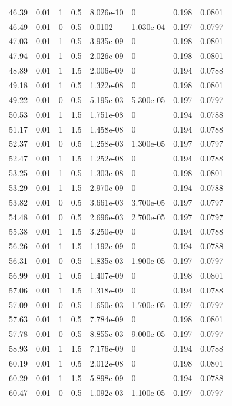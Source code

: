 \documentclass[preview]{standalone}
\begin{document}
{{{\begin{tabular}{L{1.2cm}C{1.2cm} C{0.3cm}C{0.5cm} C{1.4cm}C{1.4cm} C{1.4cm}C{1.4cm}}
  46.39  &  0.01  & 1     & 0.5 &  8.026e-10  & 0  & 0.198 &  0.0801   \\ 
  46.49  &  0.01  & 0     & 0.5 &  0.0102  & 1.030e-04  & 0.197 &  0.0797   \\ 
  47.03  &  0.01  & 1     & 0.5 &  3.935e-09  & 0  & 0.198 &  0.0801   \\ 
  47.94  &  0.01  & 1     & 0.5 &  2.026e-09  & 0  & 0.198 &  0.0801   \\ 
  48.89  &  0.01  & 1     & 1.5 &  2.006e-09  & 0  & 0.194 &  0.0788   \\ 
  49.18  &  0.01  & 1     & 0.5 &  1.322e-08  & 0  & 0.198 &  0.0801   \\ 
  49.22  &  0.01  & 0     & 0.5 &  5.195e-03  & 5.300e-05  & 0.197 &  0.0797   \\ 
  50.53  &  0.01  & 1     & 1.5 &  1.751e-08  & 0  & 0.194 &  0.0788   \\ 
  51.17  &  0.01  & 1     & 1.5 &  1.458e-08  & 0  & 0.194 &  0.0788   \\ 
  52.37  &  0.01  & 0     & 0.5 &  1.258e-03  & 1.300e-05  & 0.197 &  0.0797   \\ 
  52.47  &  0.01  & 1     & 1.5 &  1.252e-08  & 0  & 0.194 &  0.0788   \\ 
  53.25  &  0.01  & 1     & 0.5 &  1.303e-08  & 0  & 0.198 &  0.0801   \\ 
  53.29  &  0.01  & 1     & 1.5 &  2.970e-09  & 0  & 0.194 &  0.0788   \\ 
  53.82  &  0.01  & 0     & 0.5 &  3.661e-03  & 3.700e-05  & 0.197 &  0.0797   \\ 
  54.48  &  0.01  & 0     & 0.5 &  2.696e-03  & 2.700e-05  & 0.197 &  0.0797   \\ 
  55.38  &  0.01  & 1     & 1.5 &  3.250e-09  & 0  & 0.194 &  0.0788   \\ 
  56.26  &  0.01  & 1     & 1.5 &  1.192e-09  & 0  & 0.194 &  0.0788   \\ 
  56.31  &  0.01  & 0     & 0.5 &  1.835e-03  & 1.900e-05  & 0.197 &  0.0797   \\ 
  56.99  &  0.01  & 1     & 0.5 &  1.407e-09  & 0  & 0.198 &  0.0801   \\ 
  57.06  &  0.01  & 1     & 1.5 &  1.318e-09  & 0  & 0.194 &  0.0788   \\ 
  57.09  &  0.01  & 0     & 0.5 &  1.650e-03  & 1.700e-05  & 0.197 &  0.0797   \\ 
  57.63  &  0.01  & 1     & 0.5 &  7.784e-09  & 0  & 0.198 &  0.0801   \\ 
  57.78  &  0.01  & 0     & 0.5 &  8.855e-03  & 9.000e-05  & 0.197 &  0.0797   \\ 
  58.93  &  0.01  & 1     & 1.5 &  7.176e-09  & 0  & 0.194 &  0.0788   \\ 
  60.19  &  0.01  & 1     & 0.5 &  2.012e-08  & 0  & 0.198 &  0.0801   \\ 
  60.29  &  0.01  & 1     & 1.5 &  5.898e-09  & 0  & 0.194 &  0.0788   \\ 
  60.47  &  0.01  & 0     & 0.5 &  1.092e-03  & 1.100e-05  & 0.197 &  0.0797   \\ 
\hline 
\end{tabular} 

}}}
\end{document}
